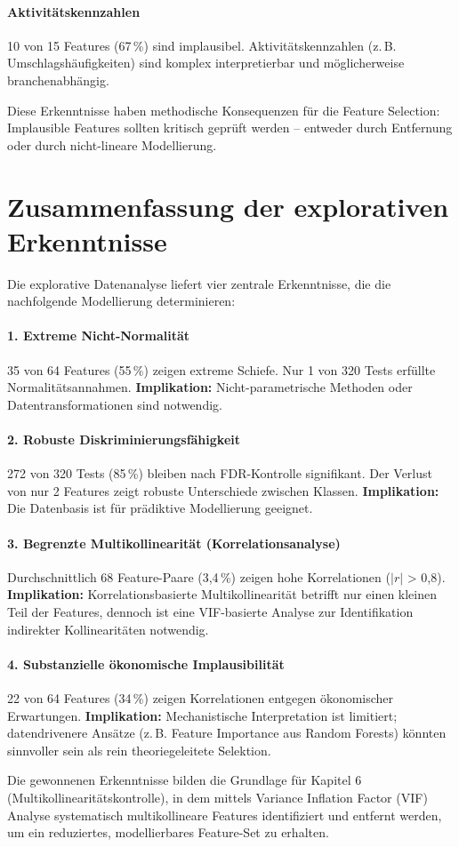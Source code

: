 \paragraph{Aktivitätskennzahlen} 10 von 15 Features (67\,\%) sind implausibel. Aktivitätskennzahlen (z.\,B. Umschlagshäufigkeiten) sind komplex interpretierbar und möglicherweise branchenabhängig.

Diese Erkenntnisse haben methodische Konsequenzen für die Feature Selection: Implausible Features sollten kritisch geprüft werden – entweder durch Entfernung oder durch nicht-lineare Modellierung.

\section{Zusammenfassung der explorativen Erkenntnisse}

Die explorative Datenanalyse liefert vier zentrale Erkenntnisse, die die nachfolgende Modellierung determinieren:

\paragraph{1. Extreme Nicht-Normalität} 35 von 64 Features (55\,\%) zeigen extreme Schiefe. Nur 1 von 320 Tests erfüllte Normalitätsannahmen. \textbf{Implikation:} Nicht-parametrische Methoden oder Datentransformationen sind notwendig.

\paragraph{2. Robuste Diskriminierungsfähigkeit} 272 von 320 Tests (85\,\%) bleiben nach FDR-Kontrolle signifikant. Der Verlust von nur 2 Features zeigt robuste Unterschiede zwischen Klassen. \textbf{Implikation:} Die Datenbasis ist für prädiktive Modellierung geeignet.

\paragraph{3. Begrenzte Multikollinearität (Korrelationsanalyse)} Durchschnittlich 68 Feature-Paare (3,4\,\%) zeigen hohe Korrelationen ($|r|$ > 0,8). \textbf{Implikation:} Korrelationsbasierte Multikollinearität betrifft nur einen kleinen Teil der Features, dennoch ist eine VIF-basierte Analyse zur Identifikation indirekter Kollinearitäten notwendig.

\paragraph{4. Substanzielle ökonomische Implausibilität} 22 von 64 Features (34\,\%) zeigen Korrelationen entgegen ökonomischer Erwartungen. \textbf{Implikation:} Mechanistische Interpretation ist limitiert; datendrivenere Ansätze (z.\,B. Feature Importance aus Random Forests) könnten sinnvoller sein als rein theoriegeleitete Selektion.

Die gewonnenen Erkenntnisse bilden die Grundlage für Kapitel 6 (Multikollinearitätskontrolle), in dem mittels Variance Inflation Factor (VIF) Analyse systematisch multikollineare Features identifiziert und entfernt werden, um ein reduziertes, modellierbares Feature-Set zu erhalten.

